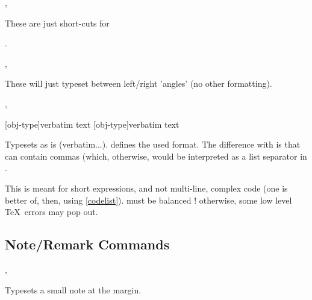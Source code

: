\documentclass{article}
\begin{document}
\begin{codedescribe}[code]{\typesetmacro,\tsmacro}
\begin{codesyntax}
\end{codesyntax}
These are just short-cuts for\par {}  .
\end{codedescribe}

\begin{codedescribe}[code]{\typesetmeta,\tsmeta}
\begin{codesyntax}
\end{codesyntax}
 These will just typeset  between left/right 'angles' (no other formatting).
\end{codedescribe}

\begin{codedescribe}[code]{\typesetverb,\tsverb}
\begin{codesyntax}
\tsmacro{\typesetverb}[obj-type]{verbatim text}
\tsmacro{\tsverb}[obj-type]{verbatim text}
\end{codesyntax}
 Typesets  as is (verbatim...).  defines the used format. The difference with  is that  can contain commas (which, otherwise, would be interpreted as a list separator in \tsobj{\tsobj}.
\end{codedescribe}
\begin{tsremark}
This is meant for short expressions, and not multi-line, complex code (one is better of, then, using \ref{codelist}).   must be balanced ! otherwise, some low level \TeX\ errors may pop out.
\end{tsremark}

\subsection{Note/Remark Commands}\label{note-commands}


\begin{codedescribe}[code]{\typesetmarginnote,\tsmarginnote}
\begin{codesyntax}
\end{codesyntax}
Typesets a small note at the margin.
\end{codedescribe}
\end{document}
